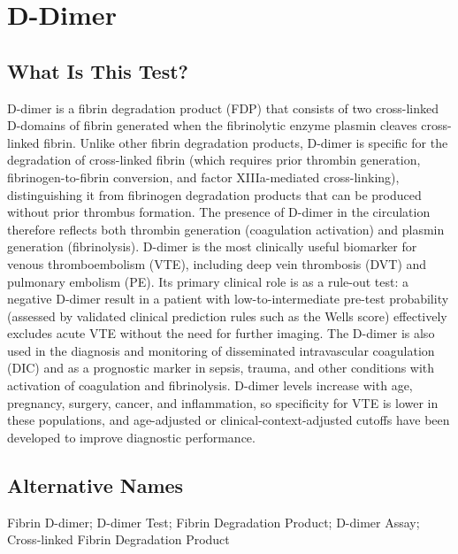 \chapter{D-Dimer}

\section*{What Is This Test?}
D-dimer is a fibrin degradation product (FDP) that consists of two cross-linked D-domains of fibrin generated when the fibrinolytic enzyme plasmin cleaves cross-linked fibrin. Unlike other fibrin degradation products, D-dimer is specific for the degradation of cross-linked fibrin (which requires prior thrombin generation, fibrinogen-to-fibrin conversion, and factor XIIIa-mediated cross-linking), distinguishing it from fibrinogen degradation products that can be produced without prior thrombus formation. The presence of D-dimer in the circulation therefore reflects both thrombin generation (coagulation activation) and plasmin generation (fibrinolysis). D-dimer is the most clinically useful biomarker for venous thromboembolism (VTE), including deep vein thrombosis (DVT) and pulmonary embolism (PE). Its primary clinical role is as a rule-out test: a negative D-dimer result in a patient with low-to-intermediate pre-test probability (assessed by validated clinical prediction rules such as the Wells score) effectively excludes acute VTE without the need for further imaging. The D-dimer is also used in the diagnosis and monitoring of disseminated intravascular coagulation (DIC) and as a prognostic marker in sepsis, trauma, and other conditions with activation of coagulation and fibrinolysis. D-dimer levels increase with age, pregnancy, surgery, cancer, and inflammation, so specificity for VTE is lower in these populations, and age-adjusted or clinical-context-adjusted cutoffs have been developed to improve diagnostic performance.

\section*{Alternative Names}
Fibrin D-dimer; D-dimer Test; Fibrin Degradation Product; D-dimer Assay; Cross-linked Fibrin Degradation Product

